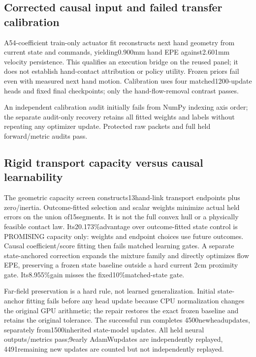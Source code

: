 \documentclass[10pt]{article}
\begin{document}
\subsection{Corrected causal input and failed transfer calibration}
A54-coefficient train-only actuator fit reconstructs next hand geometry from
current state and commands, yielding0.900mm hand EPE against2.601mm velocity
persistence. This qualifies an execution bridge on the reused panel; it does
not establish hand-contact attribution or policy utility. Frozen priors fail
even with measured next hand motion. Calibration uses four matched1200-update
heads and fixed final checkpoints; only the hand-flow-removal contrast passes.
\begin{table}[ht]\centering

\caption{Corrected-panel object-flow EPE(mm),6144windows/384heldepisodes.
Oracle rows use realized future hand motion and are nondeployable. Calibration
and frozen-prior variants are different models, not one ablation matrix.}
\end{table}
An independent calibration audit initially fails from NumPy indexing axis
order; the separate audit-only recovery retains all fitted weights and labels
without repeating any optimizer update. Protected raw packets and full held
forward/metric audits pass.

\clearpage
\subsection{Rigid transport capacity versus causal learnability}
The geometric capacity screen constructs13hand-link transport endpoints plus
zero/inertia. Outcome-fitted selection and scalar weights minimize actual
held errors on the union of15segments. It is not the full convex hull or a
physically feasible contact law. Its20.173\%advantage over outcome-fitted state
control is PROMISING capacity only: weights and endpoint choices use future
outcomes. Causal coefficient/score fitting then fails matched learning gates.
A separate state-anchored correction expands the mixture family and directly
optimizes flow EPE, preserving a frozen state baseline outside a hard current
2cm proximity gate. Its8.955\%gain misses the fixed10\%matched-state gate.
\begin{table}[ht]\centering\small

\caption{Different transport families, equal-episode EPE(mm) on corrected held
data. Each row has its own matched state control. The first row is an oracle;
it must not be read as a deployable winner over the learned rows.}
\end{table}
Far-field preservation is a hard rule, not learned generalization. Initial
state-anchor fitting fails before any head update because CPU normalization
changes the original GPU arithmetic; the repair restores the exact frozen
baseline and retains the original tolerance. The successful run completes
4500newheadupdates, separately from1500inherited state-model updates. All held
neural outputs/metrics pass;9early AdamWupdates are independently replayed,
4491remaining new updates are counted but not independently replayed.
\end{document}
